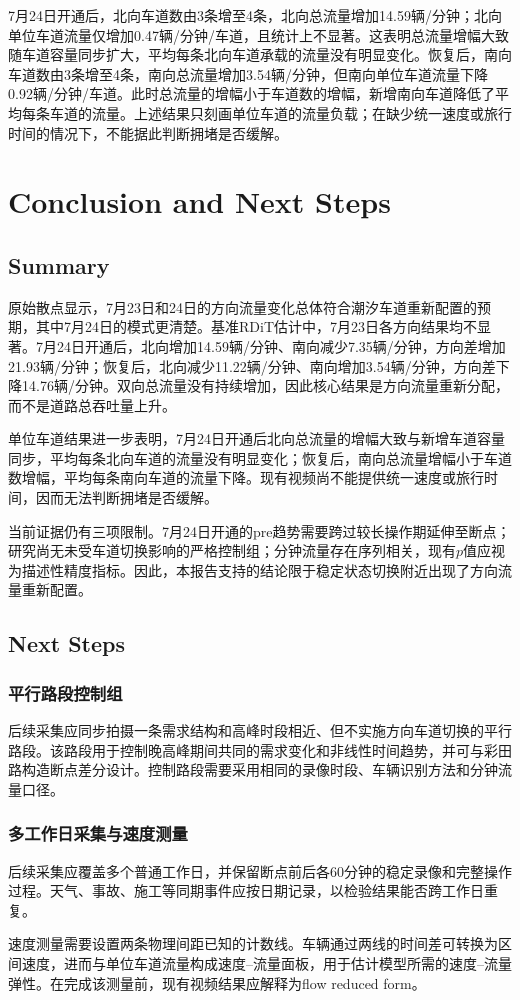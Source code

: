 \documentclass[11pt,a4paper]{ctexart}
\begin{document}
7月24日开通后，北向车道数由3条增至4条，北向总流量增加14.59辆/分钟；北向单位车道流量仅增加0.47辆/分钟/车道，且统计上不显著。这表明总流量增幅大致随车道容量同步扩大，平均每条北向车道承载的流量没有明显变化。恢复后，南向车道数由3条增至4条，南向总流量增加3.54辆/分钟，但南向单位车道流量下降0.92辆/分钟/车道。此时总流量的增幅小于车道数的增幅，新增南向车道降低了平均每条车道的流量。上述结果只刻画单位车道的流量负载；在缺少统一速度或旅行时间的情况下，不能据此判断拥堵是否缓解。

\section{Conclusion and Next Steps}

\subsection{Summary}

原始散点显示，7月23日和24日的方向流量变化总体符合潮汐车道重新配置的预期，其中7月24日的模式更清楚。基准RDiT估计中，7月23日各方向结果均不显著。7月24日开通后，北向增加14.59辆/分钟、南向减少7.35辆/分钟，方向差增加21.93辆/分钟；恢复后，北向减少11.22辆/分钟、南向增加3.54辆/分钟，方向差下降14.76辆/分钟。双向总流量没有持续增加，因此核心结果是方向流量重新分配，而不是道路总吞吐量上升。

单位车道结果进一步表明，7月24日开通后北向总流量的增幅大致与新增车道容量同步，平均每条北向车道的流量没有明显变化；恢复后，南向总流量增幅小于车道数增幅，平均每条南向车道的流量下降。现有视频尚不能提供统一速度或旅行时间，因而无法判断拥堵是否缓解。

当前证据仍有三项限制。7月24日开通的pre趋势需要跨过较长操作期延伸至断点；研究尚无未受车道切换影响的严格控制组；分钟流量存在序列相关，现有$p$值应视为描述性精度指标。因此，本报告支持的结论限于稳定状态切换附近出现了方向流量重新配置。

\subsection{Next Steps}

\subsubsection{平行路段控制组}

后续采集应同步拍摄一条需求结构和高峰时段相近、但不实施方向车道切换的平行路段。该路段用于控制晚高峰期间共同的需求变化和非线性时间趋势，并可与彩田路构造断点差分设计。控制路段需要采用相同的录像时段、车辆识别方法和分钟流量口径。

\subsubsection{多工作日采集与速度测量}

后续采集应覆盖多个普通工作日，并保留断点前后各60分钟的稳定录像和完整操作过程。天气、事故、施工等同期事件应按日期记录，以检验结果能否跨工作日重复。

速度测量需要设置两条物理间距已知的计数线。车辆通过两线的时间差可转换为区间速度，进而与单位车道流量构成速度--流量面板，用于估计模型所需的速度--流量弹性。在完成该测量前，现有视频结果应解释为flow reduced form。
\end{document}
